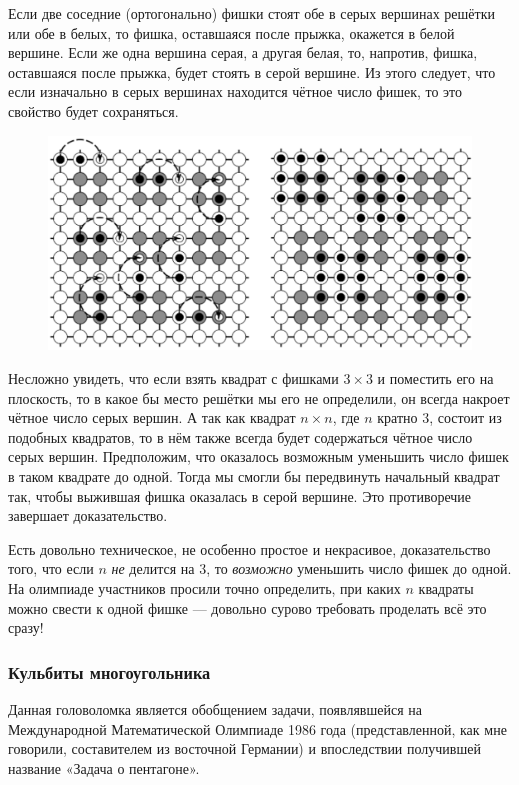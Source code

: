 Если две соседние (ортогонально) фишки стоят обе в серых вершинах решётки или обе в белых, то фишка, оставшаяся после прыжка, окажется в белой вершине.
Если же одна вершина серая, а другая белая, то, напротив, фишка, оставшаяся после прыжка, будет стоять в серой вершине.
Из этого следует, что если изначально в серых вершинах находится чётное число фишек, то это свойство будет сохраняться.

\begin{figure}[h!]
\centering
\includegraphics[scale=0.5]{Figs/Algorithms/square}
\end{figure}

Несложно увидеть, что если взять квадрат с фишками $3\times 3$ и поместить его на плоскость, то в какое бы место решётки мы его не определили, он всегда накроет чётное число серых вершин.
А так как квадрат $n\times n$, где $n$ кратно $3$, состоит из подобных квадратов, то в нём также всегда будет содержаться чётное число серых вершин.
Предположим, что оказалось возможным уменьшить число фишек в таком квадрате до одной.
Тогда мы смогли бы передвинуть начальный квадрат так, чтобы выжившая фишка оказалась в серой вершине. 
Это противоречие завершает доказательство.
\heart

Есть довольно техническое, не особенно простое и некрасивое, 
доказательство того, что если $n$ \emph{не} делится на $3$, то \emph{возможно} уменьшить число фишек до одной.
На олимпиаде участников просили точно определить, при каких $n$ квадраты можно свести к одной фишке --- довольно сурово требовать проделать всё это сразу!

\subsubsection*{Кульбиты многоугольника}%

Данная головоломка является обобщением задачи, появлявшейся на Международной Математической Олимпиаде 1986 года (представленной, как мне говорили, составителем из восточной Германии) и впоследствии получившей название «Задача о пентагоне».

